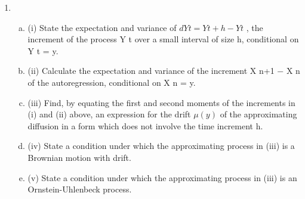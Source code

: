 \documentclass[a4paper,12pt]{article}
\begin{document}
\begin{enumerate}
    \item 
\begin{enumerate}[(a)]
\item (i) State the expectation and variance of $dY t = Y t+h − Y t$ , the increment of the process Y t over a small interval of size h, conditional on Y t = y.

\item (ii) Calculate the expectation and variance of the increment X n+1 − X n of the autoregression, conditional on X n = y.

\item (iii) Find, by equating the first and second moments of the increments in (i) and (ii) above, an expression for the drift $\mu(y)$ of the approximating diffusion in a form which does not involve the time increment h.
\item 
(iv) State a condition under which the approximating process in (iii) is a Brownian motion with drift.
\item 
(v) State a condition under which the approximating process in (iii) is an Ornstein-Uhlenbeck process.
\end{enumerate}

\end{enumerate}
\end{document}
